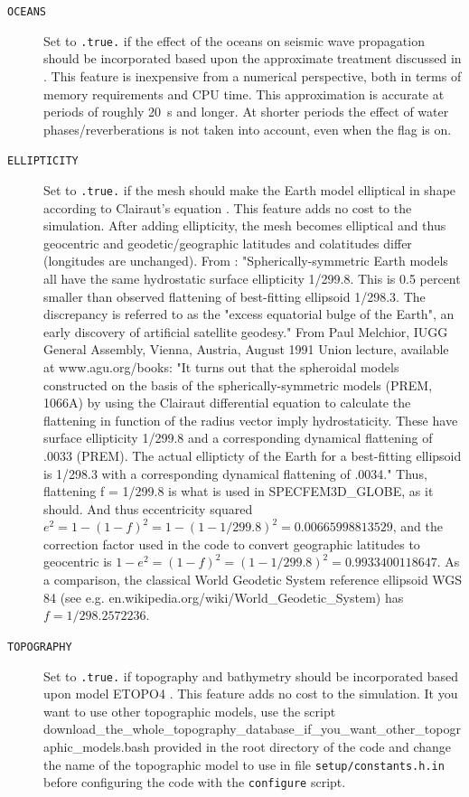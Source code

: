 \documentclass[oneside,english]{book}
\begin{document}
\begin{description}
\item [{\texttt{OCEANS}}] Set to \texttt{.true.} if the effect of the oceans
on seismic wave propagation should be incorporated based upon the
approximate treatment discussed in \citet{KoTr02b}. This feature
is inexpensive from a numerical perspective, both in terms of memory
requirements and CPU time. This approximation is accurate at periods
of roughly 20~s and longer. At shorter periods the effect of water
phases/reverberations is not taken into account, even when the flag
is on.
\item [{\texttt{ELLIPTICITY}}] Set to \texttt{.true.} if the mesh should
make the Earth model elliptical in shape according to Clairaut's equation
\citep{DaTr98}. This feature adds no cost to the simulation.
After adding ellipticity, the mesh becomes elliptical and thus geocentric and geodetic/geographic latitudes and colatitudes differ (longitudes are unchanged).
%
From \cite{DaTr98}: "Spherically-symmetric Earth models all have the same hydrostatic surface ellipticity 1/299.8. This is 0.5 percent smaller than observed flattening of best-fitting ellipsoid 1/298.3. The discrepancy is referred to as the "excess equatorial bulge of the Earth", an early discovery of artificial satellite geodesy."
%
From Paul Melchior, IUGG General Assembly, Vienna, Austria, August 1991 Union lecture, available at www.agu.org/books: "It turns out that the spheroidal models constructed on the basis of the spherically-symmetric models (PREM, 1066A) by using the Clairaut differential equation to calculate the flattening
in function of the radius vector imply hydrostaticity. These have surface ellipticity 1/299.8 and
a corresponding dynamical flattening of .0033 (PREM). The actual ellipticty of the Earth for a best-fitting ellipsoid is 1/298.3 with a corresponding dynamical flattening of .0034."
%
Thus, flattening f = 1/299.8 is what is used in SPECFEM3D\_GLOBE, as it should. And thus eccentricity squared $e^2 = 1 - (1-f)^2 = 1 - (1 - 1/299.8)^2 = 0.00665998813529$, and the correction factor used in the code to convert geographic latitudes to geocentric is $1 - e^2 = (1-f)^2 = (1 - 1/299.8)^2 = 0.9933400118647$.
%
As a comparison, the classical World Geodetic System reference ellipsoid WGS 84 (see e.g. en.wikipedia.org/wiki/World\_Geodetic\_System) has $f = 1/298.2572236$.
%
\item [{\texttt{TOPOGRAPHY}}] Set to \texttt{.true.} if topography and
bathymetry should be incorporated based upon model ETOPO4 \citep{Etopo5}.
This feature adds no cost to the simulation.
It you want to use other topographic models, use the script download\_the\_whole\_topography\_database\_if\_you\_want\_other\_topographic\_models.bash provided in the root directory of the code and change the name of the topographic model to use in file \texttt{setup/constants.h.in} before configuring the code with the \texttt{configure} script.

\end{description}
\end{document}
